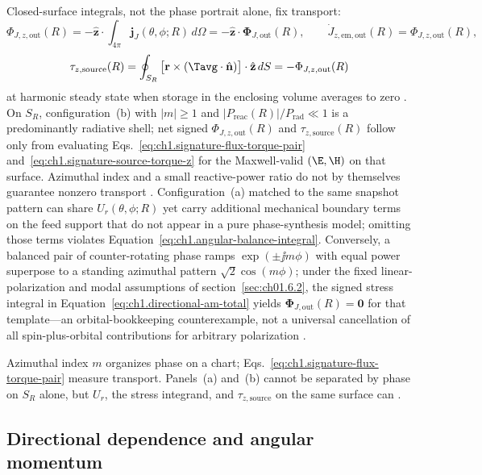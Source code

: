 Closed-surface integrals, not the phase portrait alone, fix transport:
\begin{equation}
\label{eq:ch1.signature-flux-torque-pair}
\Phi_{J,z,\mathrm{out}}(R)
=-\hat{\mathbf{z}}\cdot\int_{4\pi}\mathbf{j}_J(\theta,\phi;R)\,d\Omega
=-\hat{\mathbf{z}}\cdot\boldsymbol{\Phi}_{J,\mathrm{out}}(R),
\qquad
\dot J_{z,\mathrm{em,out}}(R)=\Phi_{J,z,\mathrm{out}}(R),
\end{equation}
\begin{equation}
\label{eq:ch1.signature-source-torque-z}
\tau_{z,\mathrm{source}}(R)
=\oint_{S_R}\big[\mathbf{r}\times(\Tavg\cdot\hat{\mathbf{n}})\big]\cdot\hat{\mathbf{z}}\,dS
=-\Phi_{J,z,\mathrm{out}}(R)
\end{equation}
at harmonic steady state when storage in the enclosing volume averages to zero \cite{beth1936,stratton1941}.
On \(S_R\), configuration~(b) with \(|m|\ge 1\) and \(|P_{\mathrm{reac}}(R)|/P_{\mathrm{rad}}\ll 1\) is a predominantly radiative shell; net signed \(\Phi_{J,z,\mathrm{out}}(R)\) and \(\tau_{z,\mathrm{source}}(R)\) follow only from evaluating Eqs.~\eqref{eq:ch1.signature-flux-torque-pair} and~\eqref{eq:ch1.signature-source-torque-z} for the Maxwell-valid \((\E,\H)\) on that surface. Azimuthal index and a small reactive-power ratio do not by themselves guarantee nonzero transport \cite{stratton1941,allen1992}.
Configuration~(a) matched to the same snapshot pattern can share \(U_r(\theta,\phi;R)\)
yet carry additional mechanical boundary terms on the feed support that do not appear
in a pure phase-synthesis model; omitting those terms violates
Equation~\eqref{eq:ch1.angular-balance-integral}. Conversely, a balanced pair of
counter-rotating phase ramps \(\exp(\pm\jj m\phi)\) with equal power superpose to a standing azimuthal pattern \(\sqrt{2}\cos(m\phi)\); under the fixed linear-polarization and modal assumptions of section~\ref{sec:ch01.6.2}, the signed stress integral in Equation~\eqref{eq:ch1.directional-am-total} yields \(\boldsymbol{\Phi}_{J,\mathrm{out}}(R)=\mathbf{0}\) for that template---an orbital-bookkeeping counterexample, not a universal cancellation of all spin-plus-orbital contributions for arbitrary polarization \cite{allen1992,stratton1941}.

Azimuthal index $m$ organizes phase on a chart; Eqs.~\eqref{eq:ch1.signature-flux-torque-pair} measure transport. Panels~(a) and~(b) cannot be separated by phase on $S_R$ alone, but $U_r$, the stress integrand, and $\tau_{z,\mathrm{source}}$ on the same surface can \cite{stratton1941,beth1936}.
\subsection{Directional dependence and angular momentum}
\label{sec:ch01.2.1}


